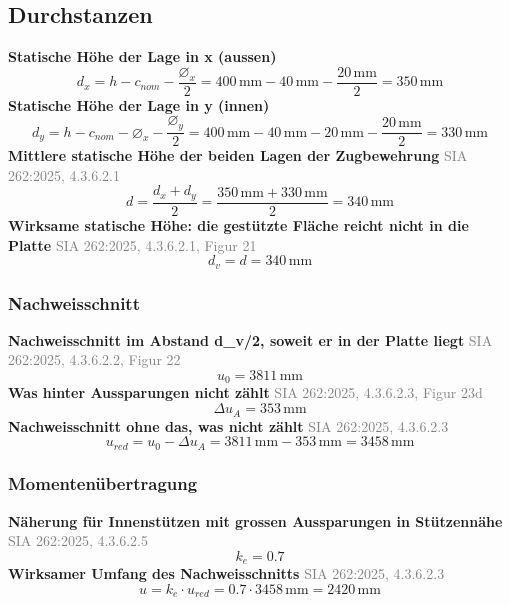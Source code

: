 \documentclass[11pt,a4paper]{article}
\newcommand{\normref}[1]{{\small\textcolor{gray}{#1}}}
\begin{document}
\subsection{Durchstanzen}
\noindent\textbf{Statische Höhe der Lage in x (aussen)}
\begin{equation*}
d_x = h - c_{nom} - \frac{\varnothing_x}{2} = 400\,\mathrm{mm} - 40\,\mathrm{mm} - \frac{20\,\mathrm{mm}}{2} = 350\,\mathrm{mm}
\end{equation*}
\noindent\textbf{Statische Höhe der Lage in y (innen)}
\begin{equation*}
d_y = h - c_{nom} - \varnothing_x - \frac{\varnothing_y}{2} = 400\,\mathrm{mm} - 40\,\mathrm{mm} - 20\,\mathrm{mm} - \frac{20\,\mathrm{mm}}{2} = 330\,\mathrm{mm}
\end{equation*}
\noindent\textbf{Mittlere statische Höhe der beiden Lagen der Zugbewehrung} \hfill \normref{SIA 262:2025, 4.3.6.2.1}
\begin{equation*}
d = \frac{d_x + d_y}{2} = \frac{350\,\mathrm{mm} + 330\,\mathrm{mm}}{2} = 340\,\mathrm{mm}
\end{equation*}
\noindent\textbf{Wirksame statische Höhe: die gestützte Fläche reicht nicht in die Platte} \hfill \normref{SIA 262:2025, 4.3.6.2.1, Figur 21}
\begin{equation*}
d_v = d = 340\,\mathrm{mm}
\end{equation*}
\subsubsection{Nachweisschnitt}
\noindent\textbf{Nachweisschnitt im Abstand d\_v/2, soweit er in der Platte liegt} \hfill \normref{SIA 262:2025, 4.3.6.2.2, Figur 22}
\begin{equation*}
u_0 = 3811\,\mathrm{mm}
\end{equation*}
\noindent\textbf{Was hinter Aussparungen nicht zählt} \hfill \normref{SIA 262:2025, 4.3.6.2.3, Figur 23d}
\begin{equation*}
\Delta u_A = 353\,\mathrm{mm}
\end{equation*}
\noindent\textbf{Nachweisschnitt ohne das, was nicht zählt} \hfill \normref{SIA 262:2025, 4.3.6.2.3}
\begin{equation*}
u_{red} = u_0 - \Delta u_A = 3811\,\mathrm{mm} - 353\,\mathrm{mm} = 3458\,\mathrm{mm}
\end{equation*}
\subsubsection{Momentenübertragung}
\noindent\textbf{Näherung für Innenstützen mit grossen Aussparungen in Stützennähe} \hfill \normref{SIA 262:2025, 4.3.6.2.5}
\begin{equation*}
k_e = 0.7
\end{equation*}
\noindent\textbf{Wirksamer Umfang des Nachweisschnitts} \hfill \normref{SIA 262:2025, 4.3.6.2.3}
\begin{equation*}
u = k_e \cdot u_{red} = 0.7 \cdot 3458\,\mathrm{mm} = 2420\,\mathrm{mm}
\end{equation*}
\end{document}
